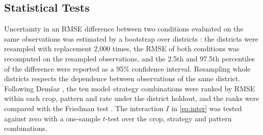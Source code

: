 \subsection{Statistical Tests}

Uncertainty in an RMSE difference between two conditions evaluated on the same observations was
estimated by a bootstrap over districts \cite{efron1993}: the districts were resampled with
replacement 2,000 times, the RMSE of both conditions was recomputed on the resampled observations,
and the 2.5th and 97.5th percentiles of the difference were reported as a 95\% confidence interval.
Resampling whole districts respects the dependence between observations of the same district.
Following Dem\v{s}ar \cite{demsar2006}, the ten model--strategy combinations were ranked by RMSE
within each crop, pattern and rate under the district holdout, and the ranks were compared with the
Friedman test \cite{friedman1937}. The interaction $I$ in \eqref{eq:inter} was tested against zero
with a one-sample $t$-test over the crop, strategy and pattern combinations.
